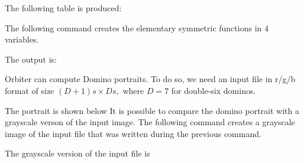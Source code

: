 
The following table is produced:



\bigskip




The following command creates the elementary symmetric functions in $4$ variables.


The output is:

\bigskip

Orbiter can compute Domino portraits. 
To do so, we need an input file in r/g/b format 
of size $(D+1)s \times Ds,$ where $D=7$ for double-six dominos.


The portrait is shown 
below
It is possible to compare the domino portrait with a grayscale verson of the input image.
The following command creates a grayscale image of the input file 
that was written during the previous command.


The grayscale version of the input file is 





\bigskip


